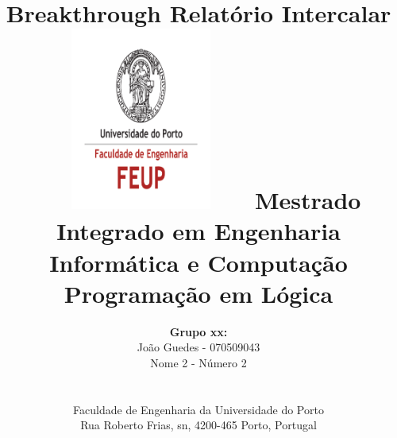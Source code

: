 \documentclass[15pt,a4paper]{article}
\begin{document}
\setlength{\textwidth}{16cm}
\setlength{\textheight}{22cm}

\title{\Huge\textbf{Breakthrough}\linebreak\linebreak\linebreak
\Large\textbf{Relatório Intercalar}\linebreak\linebreak
\includegraphics[height=6cm, width=7cm]{feup.pdf}\linebreak \linebreak
\Large{Mestrado Integrado em Engenharia Informática e Computação} \linebreak \linebreak
\Large{Programação em Lógica}\linebreak
}

\author{\textbf{Grupo xx:}\\ João Guedes - 070509043 \\ Nome 2 - Número 2 \\\linebreak\linebreak \\
 \\ Faculdade de Engenharia da Universidade do Porto \\ Rua Roberto Frias, s\/n, 4200-465 Porto, Portugal \linebreak\linebreak\linebreak
\linebreak\linebreak\vspace{1cm}}
\maketitle
\thispagestyle{empty}

\end{document}
